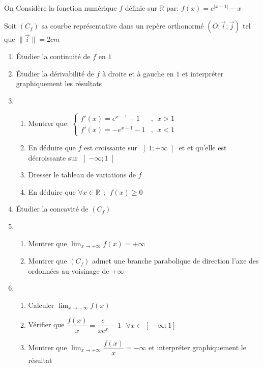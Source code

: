 \documentclass[12pt,a4paper]{report}
\begin{document}
	\begin{exercise}
	\\
	On Considère  la fonction numérique  $f$  définie  sur $\mathbb{R} $ par: $ f(x) =e^{\left| x-1\right| }-x $
	
	
	Soit  $\left( C_f\right) $  sa courbe représentative dans un repère orthonormé $(O; \overrightarrow{i};\overrightarrow{j})$ 
	tel que $\|\overrightarrow{i}\|=2cm$


\begin{enumerate}
\item Étudier la continuité de $f$ en $1$
	\item Étudier la dérivabilité de $f$ à droite et  à gauche en $1$ et  interpréter graphiquement les résultats
\item 
\begin{enumerate}
\item  Montrer que:	$ \begin{cases} f'(x)=e^{x-1 }-1 & , \ \ x>1 \\
	f'\left( x\right) =-e^{x-1 }-1 & , \ \ x<1 \end{cases} $
	
	
	\item  En déduire  que $f$ est croissante sur $\left]1;+\infty\right[ $ et et qu'elle est décroissante sur  $\left]-\infty;1\right[ $ 
	\item  Dresser le  tableau de variations de $f$
	\item  En déduire  que $\forall x \in \mathbb{R} \ \ ; \ \ f(x)\geq0 $
	
\end{enumerate} 
\item  Étudier la concavité de $\left( C_f\right) $
\item 
\begin{enumerate} 
	\item Montrer que  $\displaystyle{\lim_{x \to +\infty} f(x)}=+\infty $  
	\item Montrer que $\left( C_f\right) $ admet une branche parabolique de direction l'axe des ordonnées au voisinage de $+\infty$
\end{enumerate} 
\item 
\begin{enumerate} 
	\item Calculer   $\displaystyle{\lim_{x \to -\infty} f(x)} $  
	\item Vérifier  que $\dfrac{f(x)}{x}=\dfrac{e}{xe^x}-1 \ \ \ \forall x \in \left]-\infty;1\right] $ 
\item Montrer que $\displaystyle{\lim_{x \to +\infty} \dfrac{f(x)}{x}}=-\infty $  et  interpréter  graphiquement le résultat
\end{enumerate}


\end{enumerate}
\end{exercise}
\end{document}
